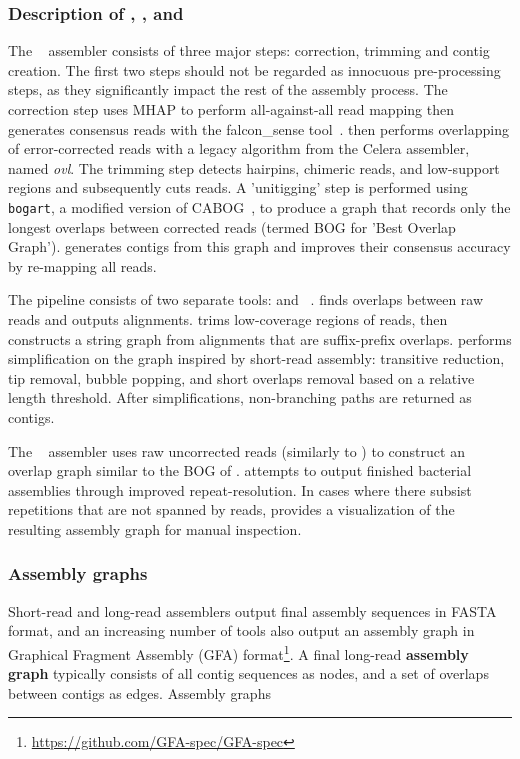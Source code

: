 \documentclass[./main.tex]{subfiles}
\begin{document}
\subsubsection{Description of \canu, \miniasm, and \hinge}

The \canu~\citep{canu} assembler consists of three major steps: correction, trimming and contig creation. The first two steps should not be regarded as innocuous pre-processing steps, as they significantly impact the rest of the assembly process.
%
The correction step uses MHAP to perform all-against-all read mapping then generates consensus reads with the falcon\_sense tool~\citep{falconsense}. \canu then performs overlapping of error-corrected reads with a legacy algorithm from the Celera assembler, named \textit{ovl}.
%
The trimming step detects hairpins, chimeric reads, and low-support regions and subsequently cuts reads.
%
A 'unitigging' step is performed using \texttt{bogart}, a modified version of CABOG~\citep{cabog}, to produce a graph that records only the longest overlaps between corrected reads (termed BOG for 'Best Overlap Graph'). 
\canu generates contigs from this graph 
and improves their consensus accuracy by re-mapping all reads.

The \miniasm pipeline consists of two separate tools: \minimap and \miniasm~\citep{miniasm}. \minimap finds overlaps between raw reads and outputs alignments.
\miniasm trims low-coverage regions of reads, then constructs a string graph from \minimap alignments that are suffix-prefix overlaps.
\miniasm performs simplification on the graph inspired by short-read assembly: transitive reduction, tip removal, bubble popping, and short overlaps removal based on a relative length threshold. 
After simplifications, non-branching paths are returned as contigs.

The \hinge~\citep{hinge} assembler uses raw uncorrected reads (similarly to  \miniasm) to construct an overlap graph similar to the BOG of \canu.
\hinge attempts to output finished bacterial assemblies through improved repeat-resolution. In cases where there subsist repetitions that are not spanned by reads, \hinge provides a visualization of the resulting assembly graph for manual inspection. 

\subsubsection{Assembly graphs}

Short-read and long-read assemblers output final assembly sequences in FASTA format, and an increasing number of tools also output an assembly graph in Graphical Fragment Assembly (GFA) format\footnote{\small\url{https://github.com/GFA-spec/GFA-spec}}. A final long-read \textbf{assembly graph} typically consists of all contig sequences as nodes, and a set of overlaps between contigs as edges. Assembly graphs 
\end{document}
